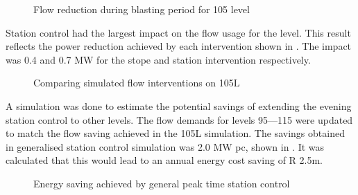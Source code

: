 	\begin{figure}[h!]
		\centering
		
		\caption{Flow reduction during blasting period for 105 level}
		\label{fig: 105 Flow savings}
	\end{figure}
Station control had the largest impact on the flow usage for the level. This result reflects the power reduction achieved by each intervention shown in . The impact was 0.4 and 0.7 MW for the stope and station intervention respectively.
	
	\begin{figure}[h!]
		\centering
		
		\caption{Comparing simulated flow interventions on 105L}
		\label{fig: Station vs stope}
	\end{figure}
A simulation was done to estimate the potential savings of extending the evening station control to other levels.  The flow demands for levels 95---115 were updated to match the flow saving achieved in the 105L simulation. The savings obtained in generalised station control simulation was 2.0 MW \gls{pc}, shown in . It was calculated that this would lead to an annual energy cost saving of R 2.5m.
\begin{figure}[h!]
	\centering
	
	\caption{Energy saving achieved by general peak time station control }
	\label{fig: General station optimise}
\end{figure}
